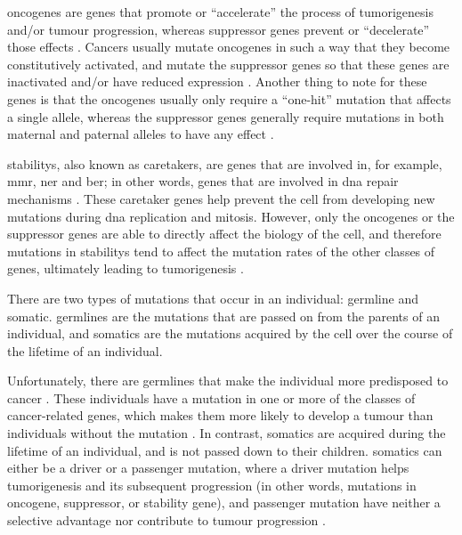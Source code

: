 \Glspl{oncogene} are genes that promote or ``accelerate'' the process of tumorigenesis and/or tumour progression, whereas \gls{suppressor} genes prevent or ``decelerate'' those effects \citep{Vogelstein2004a}.
Cancers usually mutate \glspl{oncogene} in such a way that they become constitutively activated, and mutate the \gls{suppressor} genes so that these genes are inactivated and/or have reduced expression \citep{Vogelstein2004a}.
Another thing to note for these genes is that the \glspl{oncogene} usually only require a ``one-hit'' mutation that affects a single allele, whereas the \gls{suppressor} genes generally require mutations in both maternal and paternal \glspl{allele} to have any effect \citep{Stratton2009,Vogelstein2004a}.

\Glspl{stability}, also known as caretakers, are genes that are involved in, for example,  \gls{mmr}, \gls{ner} and \gls{ber}; in other words, genes that are involved in \acrshort{dna} repair mechanisms \citep{Vogelstein2004a}.
These caretaker genes help prevent the cell from developing new mutations during \acrshort{dna} replication and mitosis.
However, only the \glspl{oncogene} or the \gls{suppressor} genes are able to directly affect the biology of the cell, and therefore mutations in \glspl{stability} tend to affect the mutation rates of the other classes of genes, ultimately leading to tumorigenesis \citep{Vogelstein2004a}.

There are two types of mutations that occur in an individual: \gls{germline} and \gls{somatic}.
\Glspl{germline} are the mutations that are passed on from the parents of an individual, and \glspl{somatic} are the mutations acquired by the cell over the course of the lifetime of an individual.

Unfortunately, there are \glspl{germline} that make the individual more predisposed to cancer \citep{Vogelstein2004a}.
These individuals have a mutation in one or more of the classes of cancer-related genes, which makes them more likely to develop a tumour than individuals without the mutation \citep{Vogelstein2004a}.
In contrast, \glspl{somatic} are acquired during the lifetime of an individual, and is not passed down to their children.
\Glspl{somatic} can either be a \gls{driver} or a \gls{passenger} mutation, where a \gls{driver} mutation helps tumorigenesis and its subsequent progression (in other words, mutations in \gls{oncogene}, \gls{suppressor}, or stability gene), and \gls{passenger} mutation have neither a selective advantage nor contribute to tumour progression \citep{Stratton2009}.

